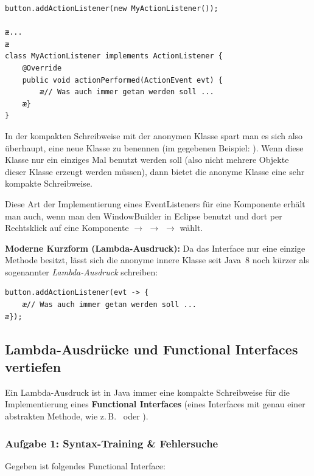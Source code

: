 \begin{compactenum}[1.]
\begin{lstlisting}
button.addActionListener(new MyActionListener());
   		
æ...
æ   		
class MyActionListener implements ActionListener {
    @Override
    public void actionPerformed(ActionEvent evt) {
        æ// Was auch immer getan werden soll ...
    æ}
}
\end{lstlisting}

In der kompakten Schreibweise mit der anonymen Klasse spart man es sich also
überhaupt, eine neue Klasse zu benennen (im gegebenen Beispiel:
). Wenn diese Klasse nur ein einziges Mal benutzt
werden soll (also nicht mehrere Objekte dieser Klasse erzeugt werden müssen),
dann bietet die anonyme Klasse eine sehr kompakte Schreibweise.

Diese Art der Implementierung eines EventListeners für eine Komponente erhält
man auch, wenn man den WindowBuilder in Eclipse benutzt und dort per Rechtsklick
auf eine Komponente $\rightarrow$  $\rightarrow$
 $\rightarrow$  wählt.

\textbf{Moderne Kurzform (Lambda-Ausdruck):} Da das Interface
 nur eine einzige Methode besitzt, lässt sich die
anonyme innere Klasse seit Java~8 noch kürzer als sogenannter
\emph{Lambda-Ausdruck} schreiben:

\begin{lstlisting}
button.addActionListener(evt -> {
    æ// Was auch immer getan werden soll ...
æ});
\end{lstlisting}
\end{compactenum}


\subsection{Lambda-Ausdrücke und Functional Interfaces vertiefen \tagZusatz \tagLK}

Ein Lambda-Ausdruck ist in Java immer eine kompakte Schreibweise für die
Implementierung eines \textbf{Functional Interfaces} (eines Interfaces mit
genau einer abstrakten Methode, wie z.\,B.\  oder
).

\subsubsection*{Aufgabe 1: Syntax-Training \& Fehlersuche \tagZusatz \tagLK}
Gegeben ist folgendes Functional Interface:

